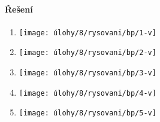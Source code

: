 \newpage

\paragraph{Řešení}
\begin{enumerate}
    \item
    \begin{minipage}[t]{\linewidth}
        \begin{quote}
            \phantom{text}
        \end{quote}
        \centering
        \texttt{[image: úlohy/8/rysovani/bp/1-v]}

    \end{minipage}

    \item
    \begin{minipage}[t]{\linewidth}
        \begin{quote}
            \phantom{text}
        \end{quote}
        \centering
        \texttt{[image: úlohy/8/rysovani/bp/2-v]}

    \end{minipage}

    \item
    \begin{minipage}[t]{\linewidth}
        \begin{quote}
            \phantom{text}
        \end{quote}
        \centering
        \texttt{[image: úlohy/8/rysovani/bp/3-v]}

    \end{minipage}

    \item
    \begin{minipage}[t]{\linewidth}
        \begin{quote}
            \phantom{text}
        \end{quote}
        \centering
        \texttt{[image: úlohy/8/rysovani/bp/4-v]}

    \end{minipage}

    \item
    \begin{minipage}[t]{\linewidth}
        \begin{quote}
            \phantom{text}
        \end{quote}
        \centering
        \texttt{[image: úlohy/8/rysovani/bp/5-v]}


\end{minipage}
\end{enumerate}
